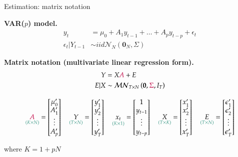 \documentclass[notes,blackandwhite,mathsans,usenames,dvipsnames]{beamer}
\begin{document}
\begin{frame}{Estimation: matrix notation}


\textbf{VAR($p$) model.}
\begin{align*}
y_t &= \mu_0 + A_1 y_{t-1} + \dots + A_p y_{t-p} + \epsilon_t\\
\epsilon_t|Y_{t-1} &\sim iid\mathcal{N}_N\left(\mathbf{0}_N,\Sigma\right)
\end{align*}


\smallskip\textbf{Matrix notation (multivariate linear regression form).}
\begin{align*} 
Y &= X{\color{purple}A} + E\\
E|X &\sim\mathcal{MN}_{T\times N}\left(\mathbf{0},{\color{purple}\Sigma}, I_T\right)
\end{align*} 

\footnotesize
$$ 
\underset{\color{mcxs2}(K\times N)}{{\color{purple}A}}=\begin{bmatrix} \mu_0'\\ A_1'\\ \vdots \\ A_p' \end{bmatrix} \quad
\underset{\color{mcxs2}(T\times N)}{Y}= \begin{bmatrix}y_1' \\ y_2'\\ \vdots \\ y_T'\end{bmatrix} \quad
\underset{\color{mcxs2}(K\times1)}{x_t}=\begin{bmatrix} 1\\ y_{t-1}\\ \vdots \\ y_{t-p} \end{bmatrix}\quad
\underset{\color{mcxs2}(T\times K)}{X}= \begin{bmatrix}x_1' \\ x_2' \\ \vdots \\ x_{T}'\end{bmatrix} \quad
\underset{\color{mcxs2}(T\times N)}{E}= \begin{bmatrix}\epsilon_1' \\ \epsilon_2' \\ \vdots \\ \epsilon_{T}'\end{bmatrix}
$$

{\color{mcxs2}where} $K=1+pN$
\end{frame}
\end{document}
